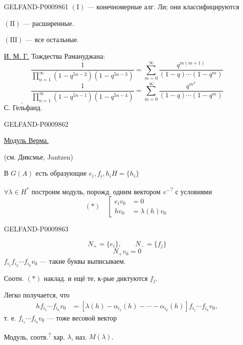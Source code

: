 \begin{GelfandAdjacentEvidence}{GELFAND-P000986}{1}
$(\mathrm I)$ --- конечномерные алг. Ли; они классифицируются

$(\mathrm{II})$ --- расширенные.

$(\mathrm{III})$ --- все остальные.

\underline{И. М. Г.} Тождества Рамануджана:
\[
\frac{1}{\displaystyle\prod_{n=1}^{\infty}(1-q^{5n-2})(1-q^{5n-3})}
=\sum_{m=0}^{\infty}\frac{q^{m(m+1)}}{(1-q)\cdots(1-q^m)}
\]
\[
\frac{1}{\displaystyle\prod_{n=1}^{\infty}(1-q^{5n-1})(1-q^{5n-4})}
=\sum_{m=0}^{\infty}\frac{q^{m^2}}{(1-q)\cdots(1-q^m)}
\]
$\underrightarrow{\text{С. Гельфанд.}}$

\end{GelfandAdjacentEvidence}
\begin{GelfandAdjacentEvidence}{GELFAND-P000986}{2}


\underline{Модуль Верма.}

(см. Диксмье, Jantzen)

В $G(A)$ есть образующие $e_i,f_i,h_i$\qquad $H=\{h_i\}$

$\forall\lambda\in H^*$ построим модуль, порожд. одним вектором $v^{-}$\textsuperscript{?} с условиями
\[
(*)\quad\left[
\begin{aligned}
e_i v_0&=0\\
h v_0&=\lambda(h)v_0
\end{aligned}
\right.
\]
\end{GelfandAdjacentEvidence}
\begin{GelfandAdjacentEvidence}{GELFAND-P000986}{3}

\[
N_+=\{e_i\},\qquad N_-=\{f_j\}
\]
\[
N_+v_0=0
\]
$f_{i_1}f_{i_2}\cdots f_{i_k}v_0$ --- такие буквы выписываем.

Соотн. $(*)$ наклад. и ещё те, к-рые диктуются $f_j$.

Легко получается, что
\[
\begin{aligned}
h f_{i_1}\cdots f_{i_k}v_0
&=[\lambda(h)-\alpha_{i_1}(h)-\cdots-\alpha_{i_k}(h)]
f_{i_1}\cdots f_{i_k}v_0,
\end{aligned}
\]
т. е. $f_{i_1}\cdots f_{i_k}v_0$ --- тоже весовой вектор

Модуль, соотв.\textsuperscript{?} хар. $\lambda$, наз. $M(\lambda)$.
\end{GelfandAdjacentEvidence}
